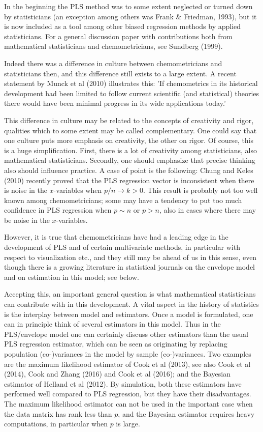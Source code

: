\documentclass[11pt]{article}
\begin{document}
In the beginning the PLS method was to some extent neglected or turned down by statisticians (an exception among others was Frank \& Friedman, 1993), but it is now included as a tool among other biased regression methods by applied statisticians. For a general discussion paper with contributions both from mathematical statisticians and chemometricians, see Sundberg (1999).

Indeed there was a difference in culture between chemometricians and statisticians then, and this difference still exists to a large extent. A recent statement by Munck et al (2010) illustrates this: 'If chemometrics in its historical development had been limited to follow current scientific (and statistical) theories there would have been minimal progress in its wide applications today.' 

This difference in culture may be related to the concepts of creativity and rigor, qualities which to some extent may be called complementary. One could say that one culture puts more emphasis on creativity, the other on rigor. Of course, this is a huge simplification.  First, there is a lot of creativity among statisticians, also mathematical statisticians. Secondly, one should emphasize that precise thinking also should influence practice. A case of point is the following: Chung and Keles (2010) recently proved that the PLS regression vector is inconsistent when there is noise in the $x$-variables when $p/n\rightarrow k>0$. This result is probably not too well known among chemometricians; some may have a tendency to put too much confidence in PLS regression when $p\sim n$ or $p>n$, also in cases where there may be noise in the $x$-variables. 

However, it is true that chemometricians have had a leading edge in the development of PLS and of certain multivariate methods, in particular with respect to visualization etc., and they still may be ahead of us in this sense, even though there is a growing literature in statistical journals on the envelope model and on estimation in this model; see below.

Accepting this, an important general question is what mathematical statisticians can contribute with in this development. A vital aspect in the history of statistics is the interplay between model and estimators. Once a model is formulated, one can in principle think of several estimators in this model. Thus in the PLS/envelope model one can certainly discuss other estimators than the usual PLS regression estimator, which can be seen as originating by replacing population (co-)variances in the model by sample (co-)variances. Two examples are the maximum likelihood estimator of Cook et al (2013), see also Cook et al (2014), Cook and Zhang (2016) and Cook et al (2016); and the Bayesian estimator of Helland et al (2012). By simulation, both these estimators have performed well compared to PLS regression, but they have their disadvantages. The maximum likelihood estimator can not be used in the important case when the data matrix has rank less than $p$, and the Bayesian estimator requires heavy computations, in particular when $p$ is large.
\end{document}
